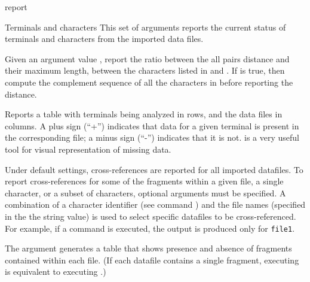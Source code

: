\begin{command}{report}{}
\begin{arguments}
	\begin{argumentgroup}{Terminals and characters}
            {This set of arguments reports the current status of terminals and
            characters from the imported data files. }
		
                {Given an argument value , report the
                ratio between the all pairs distance and their maximum length,
                between the characters listed in  and
                . If  is true, then compute the
                complement sequence of all the characters in 
                before reporting the distance. } {}

                {Reports a table with terminals being analyzed in rows, and the
                data files in columns. A plus sign (``+'') indicates that data for a given
                terminal is
                present in the corresponding file; a minus sign (``-'') indicates that it is
                not.  is a very useful tool for visual
                representation of missing data.
                
                Under default settings, cross-references are reported for
                all imported datafiles. To report cross-references for some of
                the fragments within a given file, a single character, or a subset
                of characters, optional arguments must be specified. A combination of
                a character identifier (see command  ) and
                the file names (specified in the the string value) is used to select specific
                datafiles to be cross-referenced. For example, if a
                command  is
                executed, the output is produced only for \texttt{file1}.
                
                The argument  generates
                a table that shows presence and absence of fragments contained
                within each file. (If each datafile contains a
                single fragment,  executing 
                is equivalent to executing .)
                
}
\end{argumentgroup}
\end{arguments}
\end{command}
